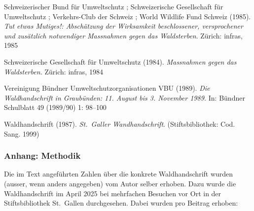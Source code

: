 \documentclass[a4paper,
fontsize=11pt,
oneside,
numbers=noperiodatend,
parskip=half-,
bibliography=totoc,
final
]{scrartcl}
\begin{document}
Schweizerischer Bund für Umweltschutz ; Schweizerische Gesellschaft für
Umweltschutz ; Verkehrs-Club der Schweiz ; World Wildlife Fund Schweiz
(1985). \emph{Tut etwas Mutiges!: Abschätzung der Wirksamkeit
beschlossener, versprochener und zusätzlich notwendiger Massnahmen gegen
das Waldsterben}. Zürich: infras, 1985

Schweizerische Gesellschaft für Umweltschutz (1984). \emph{Massnahmen
gegen das Waldsterben.} Zürich: infras, 1984

Vereinigung Bündner Umweltschutzorganisationen VBU (1989). \emph{Die
Waldhandschrift in Graubünden: 11. August bis 3. November 1989.} In:
Bündner Schulblatt 49 (1989/90) 1: 98--100

Waldhandschrift (1987). \emph{St.~Galler Wandhandschrift}.
(Stiftsbibliothek: Cod. Sang. 1999)

\subsubsection{Anhang: Methodik}\label{anhang-methodik}

Die im Text angeführten Zahlen über die konkrete Waldhandschrift wurden
(ausser, wenn anders angegeben) vom Autor selber erhoben. Dazu wurde die
Waldhandschrift im April 2025 bei mehrfachen Besuchen vor Ort in der
Stiftsbibliothek St.~Gallen durchgesehen. Dabei wurden pro Beitrag
erhoben:
\end{document}
